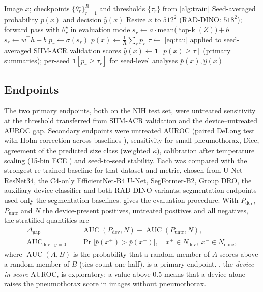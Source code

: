 \documentclass[final,3p]{elsarticle}
\DeclareMathOperator*{\topk}{top\text{-}k}
\DeclareMathOperator{\AUC}{AUC}
\begin{document}
\begin{algorithm}[!tbp]
\caption{Scoring an image with a trained configuration}
\label{alg:score}
\begin{algorithmic}[1]
\Require Image $x$; checkpoints $\{\theta^\star_r\}_{r=1}^{R}$ and thresholds $\{\tau_r\}$ from \cref{alg:train}
\Ensure Seed-averaged probability $\bar p(x)$ and decision $\hat y(x)$
  \State Resize $x$ to $512^2$ (RAD-DINO: $518^2$); forward pass with $\theta^\star_r$ in evaluation mode
   \State $s_r\gets a\cdot\mathrm{mean}\big(\topk(Z)\big)+b$ 
  \Else \State $s_r\gets w^\top h+b$
  \EndIf
  \State $p_r\gets\sigma(s_r)$ 
\EndFor
\State $\bar p(x)\gets\frac1R\sum_r p_r$ 
\State $\bar\tau\gets$ \cref{eq:tau} applied to seed-averaged SIIM-ACR validation scores\label{line:tau-avg}
\State $\hat y(x)\gets\mathbf{1}[\bar p(x)\ge\bar\tau]$ (primary summaries); per-seed $\mathbf{1}[p_r\ge\tau_r]$ for seed-level analyses
\State \Return $\bar p(x),\hat y(x)$
\end{algorithmic}
\end{algorithm}

\subsection{Endpoints}
\label{sec:endpoints}
The two primary endpoints, both on the NIH test set, were untreated sensitivity at the threshold transferred from SIIM-ACR validation and the device--untreated AUROC gap. Secondary endpoints were untreated AUROC (paired DeLong test with Holm correction across baselines \citep{delong1988,holm1979}), sensitivity for small pneumothorax, Dice, agreement of the predicted size class (weighted $\kappa$), calibration after temperature scaling (15-bin ECE \citep{guo2017calibration}) and seed-to-seed stability. Each was compared with the strongest re-trained baseline for that dataset and metric, chosen from U-Net ResNet34, the C4-only EfficientNet-B4 U-Net, SegFormer-B2, Group DRO, the auxiliary device classifier and both RAD-DINO variants; segmentation endpoints used only the segmentation baselines.  gives the evaluation procedure. With $P_{\text{dev}}$, $P_{\text{untr}}$ and $N$ the device-present positives, untreated positives and all negatives, the stratified quantities are
\begin{align}
\Delta_{\text{gap}} &= \AUC(P_{\text{dev}},N)-\AUC(P_{\text{untr}},N), \label{eq:gap}\\
\AUC_{\text{dev}\mid y=0} &= \Pr\big[\bar p(x^{+})>\bar p(x^{-})\big],\quad x^{+}\in N_{\text{dev}},\ x^{-}\in N_{\text{none}}, \label{eq:devscore}
\end{align}
where $\AUC(A,B)$ is the probability that a random member of $A$ scores above a random member of $B$ (ties count one half).  is a primary endpoint. , the \emph{device-in-score} AUROC, is exploratory: a value above 0.5 means that a device alone raises the pneumothorax score in images without pneumothorax.
\end{document}
